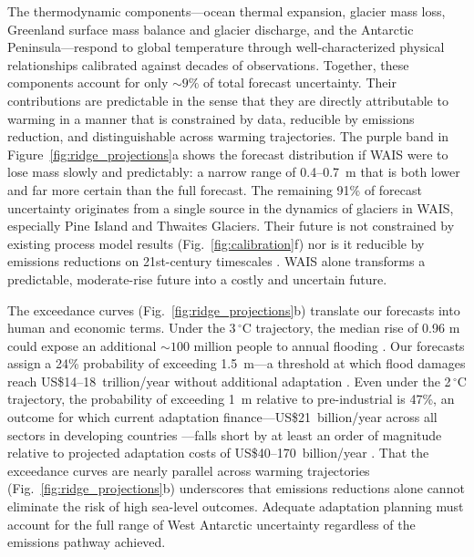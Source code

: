 \documentclass[12pt]{article}
\begin{document}
The thermodynamic components---ocean thermal expansion, glacier mass loss, Greenland surface mass balance and glacier discharge, and the Antarctic Peninsula---respond to global temperature through well-characterized physical relationships calibrated against decades of observations. Together, these components account for only ${\sim}9\%$ of total forecast uncertainty. Their contributions are predictable in the sense that they are directly attributable to warming in a manner that is constrained by data, reducible by emissions reduction, and distinguishable across warming trajectories. The purple band in Figure~\ref{fig:ridge_projections}a shows the forecast distribution if WAIS were to lose mass slowly and predictably: a narrow range of 0.4--0.7~m that is both lower and far more certain than the full forecast. The remaining 91\% of forecast uncertainty originates from a single source in the dynamics of glaciers in WAIS, especially Pine Island and Thwaites Glaciers. Their future is not constrained by existing process model results (Fig.~\ref{fig:calibration}f) nor is it reducible by emissions reductions on 21st-century timescales \citep{Naughten2023, Rosier2025}. WAIS alone transforms a predictable, moderate-rise future into a costly and uncertain future.

The exceedance curves (Fig.~\ref{fig:ridge_projections}b) translate our forecasts into human and economic terms. Under the 3$\,^\circ$C trajectory, the median rise of 0.96 m could expose an additional ${\sim}100$ million people to annual flooding \citep{Kulp2019}. Our forecasts assign a 24\% probability of exceeding 1.5~m---a threshold at which flood damages reach US\$14--18~trillion/year without additional adaptation \citep{Jevrejeva2018}. Even under the 2$\,^\circ$C trajectory, the probability of exceeding 1~m relative to pre-industrial is 47\%, an outcome for which current adaptation finance---US\$21~billion/year across all sectors in developing countries \citep{UNEP2023}---falls short by at least an order of magnitude relative to projected adaptation costs of US\$40--170~billion/year \citep{Tiggeloven2020}. That the exceedance curves are nearly parallel across warming trajectories (Fig.~\ref{fig:ridge_projections}b) underscores that emissions reductions alone cannot eliminate the risk of high sea-level outcomes. Adequate adaptation planning must account for the full range of West Antarctic uncertainty regardless of the emissions pathway achieved.
\end{document}
